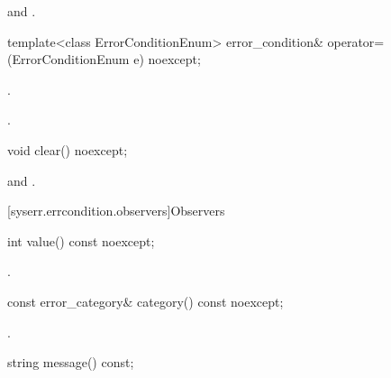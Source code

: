 \begin{itemdescr}
\pnum
\ensures {} and .
\end{itemdescr}

%
\begin{itemdecl}
template<class ErrorConditionEnum>
  error_condition& operator=(ErrorConditionEnum e) noexcept;
\end{itemdecl}

\begin{itemdescr}

\pnum
\ensures {}.

\pnum
\returns {}.

\end{itemdescr}

%
\begin{itemdecl}
void clear() noexcept;
\end{itemdecl}

\begin{itemdescr}
\pnum
\ensures {} and .
\end{itemdescr}

[syserr.errcondition.observers]{Observers}

%
\begin{itemdecl}
int value() const noexcept;
\end{itemdecl}

\begin{itemdescr}
\pnum
\returns {}.
\end{itemdescr}

%
\begin{itemdecl}
const error_category& category() const noexcept;
\end{itemdecl}

\begin{itemdescr}
\pnum
\returns {}.
\end{itemdescr}

%
\begin{itemdecl}
string message() const;
\end{itemdecl}

